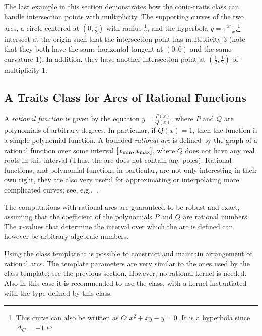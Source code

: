 
The last example in this section demonstrates how the conic-traits
class can handle intersection points with multiplicity. The
supporting curves of the two arcs, a circle centered at
$(0,\frac{1}{2})$ with radius $\frac{1}{2}$, and the hyperbola $y
= \frac{x^2}{1-x}$,\footnote{This curve can also be written as $C:
x^2 + xy - y = 0$. It is a hyperbola since $\Delta_{C} = -1$.}
intersect at the origin such that the intersection point has
multiplicity $3$ (note that they both have the same horizontal
tangent at $(0,0)$ and the same curvature $1$). In addition, they
have another intersection point at $(\frac{1}{2},\frac{1}{2})$ of
multiplicity $1$:


\subsection{A Traits Class for Arcs of Rational Functions\label{arr_ssec:tr_ratfunc}}

A {\em rational function} is given by the equation $y =
\frac{P(x)}{Q(x)}$, where $P$ and $Q$ are polynomials of arbitrary
degrees. In particular, if $Q(x) = 1$, then the function is a
simple polynomial function. A bounded {\em rational arc} is
defined by the graph of a rational function over some interval
$[x_{\rm min}, x_{\rm max}]$, where $Q$ does not have any real
roots in this interval (Thus, the arc does not contain any poles).
Rational functions, and polynomial functions in particular, are
not only interesting in their own right, they are also very useful
for approximating or interpolating more complicated curves; see,
e.g.,~\cite[Chapter~3]{cgal:ptvf-nrcpp-02}.

The computations with rational arcs are guaranteed to be robust and 
exact, assuming that the coefficient of the polynomials $P$ and $Q$
are rational  numbers. The $x$-values that determine the interval
over which the arc is defined can however be arbitrary algebraic
numbers.

Using the  class
template it is possible to construct and maintain arrangement of
rational arcs. The template parameters are very similar to the
ones used by the  class template; see
the previous section. However, no rational kernel is needed. Also
in this case it is recommended to use the
 class, with a kernel instantiated
with the  type defined by this class.

